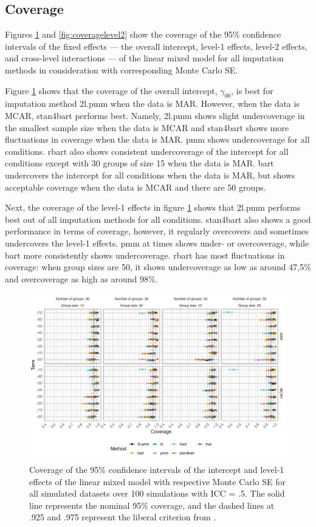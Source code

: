\documentclass[10pt, a4paper, titlepage]{article}
\begin{document}
\subsection{Coverage}
Figures \ref{fig:coveragelevel1} and \ref{fig:coveragelevel2} show the coverage of the 95\% confidence intervals of the fixed effects --- the overall intercept, level-1 effects, level-2 effects, and cross-level interactions --- of the linear mixed model for all imputation methods in consideration with corresponding Monte Carlo SE.

Figure \ref{fig:coveragelevel1} shows that the coverage of the overall intercept, $\gamma_{00}$, is best for imputation method 2l.pmm when the data is MAR. However, when the data is MCAR, stan4bart performs best. Namely, 2l.pmm shows slight undercoverage in the smallest sample size when the data is MCAR and stan4bart shows more fluctuations in coverage when the data is MAR. pmm shows undercoverage for all conditions. rbart also shows consistent undercoverage of the intercept for all conditions except with 30 groups of size 15 when the data is MAR. bart undercovers the intercept for all conditions when the data is MAR, but shows acceptable coverage when the data is MCAR and there are 50 groups. 

Next, the coverage of the level-1 effects in figure \ref{fig:coveragelevel1} shows that 2l.pmm performs best out of all imputation methods for all conditions. stan4bart also shows a good performance in terms of coverage, however, it regularly overcovers and sometimes undercovers the level-1 effects. pmm at times shows under- or overcoverage, while bart more consistently shows undercoverage. rbart has most fluctuations in coverage: when group sizes are 50, it shows undercoverage as low as around 47,5\% and overcoverage as high as around 98\%.

\begin{figure}[H]
    \centering
    \includegraphics[width=1\textwidth]{coveragelevel1.png}
    \caption{Coverage of the 95\% confidence intervals of the intercept and level-1 effects of the linear mixed model with respective Monte Carlo SE for all simulated datasets over 100 simulations with ICC = .5. The solid line represents the nominal 95\% coverage, and the dashed lines at .925 and .975 represent the liberal criterion from \citet{bradley1978}.}
    \label{fig:coveragelevel1}
\end{figure}
\end{document}
